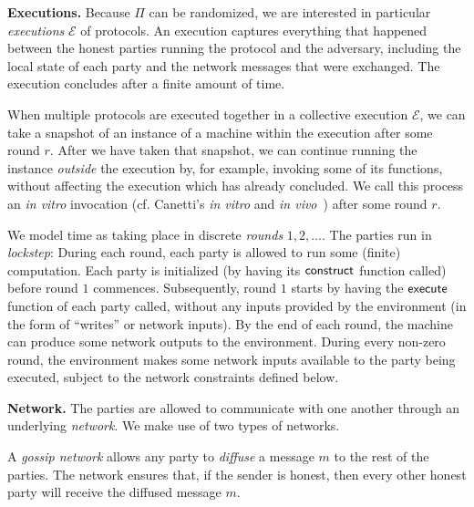 \noindent
\textbf{Executions.}
Because $\Pi$ can be randomized, we are interested in particular
\emph{executions} $\mathcal{E}$ of protocols. An execution captures
everything that happened between the honest parties running the
protocol and the adversary, including the local state of each
party and the network messages that were exchanged. The execution
concludes after a finite amount of time.

\begin{definition}
When multiple protocols are executed together in a collective execution
$\mathcal{E}$, we can take a snapshot of an instance of a machine within
the execution after some round $r$. After we have taken that snapshot, we
can continue running the instance \emph{outside} the execution by, for
example, invoking some of its functions, without affecting the execution
which has already concluded. We call this process an \emph{in vitro}
invocation (cf. Canetti's \emph{in vitro} and \emph{in vivo}~\cite{uc})
after some round $r$.
\end{definition}

\myparagraph[Time]
We model time as taking place in discrete \emph{rounds} $1, 2, \ldots$.
The parties run in \emph{lockstep}:
During each round, each party is allowed to run some (finite) computation.
Each party is initialized (by having its $\textsf{construct}$ function called)
before round $1$ commences.
Subsequently, round $1$ starts by having the $\textsf{execute}$ function of each
party called, without any inputs provided by the environment (in the form
of ``writes'' or network inputs).
By the end of each round, the machine can produce some network outputs
to the environment. During every non-zero round, the environment
makes some network inputs available to the party being executed,
subject to the network constraints defined below.

\noindent
\textbf{Network.}
The parties are allowed to communicate with one another through an
underlying \emph{network}. We make use of two types of networks.

\begin{definition}
  A \emph{gossip network}
  allows any party to \emph{diffuse} a message $m$ to the rest of the parties.
  The network ensures that, if the sender is honest, then every other honest party
  will receive the diffused message $m$.
\end{definition}

